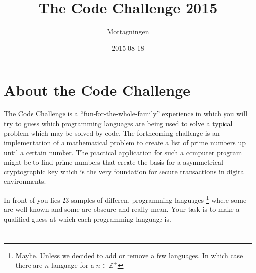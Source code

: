 \documentclass[a4paper]{report}
\title{The Code Challenge 2015}
\author{Mottagningen}
\date{2015-08-18}
\begin{document}
\maketitle
\setcounter{page}{2}

\chapter*{About the Code Challenge}
The Code Challenge is a ``fun-for-the-whole-family'' experience in which you
will try to guess which programming languages are being used to solve a
typical problem which may be solved by code. The forthcoming challenge is an
implementation of a mathematical problem to create a list of prime numbers
up until a certain number. The practical application for such a computer
program might be to find prime numbers that create the basis for a
asymmetrical cryptographic key which is the very foundation for secure
transactions in digital environments.

In front of you lies 23 samples of different programming languages
\footnote{Maybe. Unless we decided to add or remove a few languages.
    In which case there are $n$ language for a $n \in \mathbb{Z}^+$}
where some are well known and some are obscure and really mean.
Your task is to make a qualified guess at which each programming language is.

\newpage
{}
\setcounter{page}{0}
\chapter{}

\chapter{}

\chapter{}

\chapter{}

\chapter{}

\chapter{}

\end{document}

